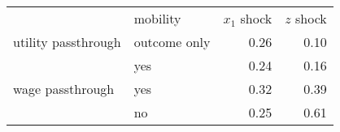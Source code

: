 \begin{tabular}{l l r r} 
\toprule 
 & mobility & $x_1$ shock & $z$ shock\\
 \cmidrule(lr){2-4}
utility passthrough & outcome only & 0.26 & 0.10\\
 & yes & 0.24 & 0.16\\
wage passthrough & yes & 0.32 & 0.39\\
 & no & 0.25 & 0.61\\
\bottomrule 
\end{tabular}
